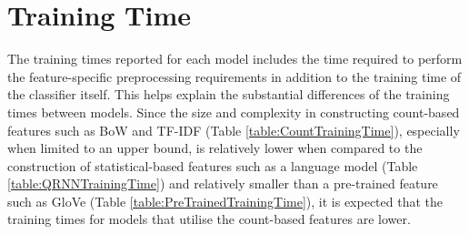 \documentclass[a4paper,twoside,phd]{BYUPhys}
\begin{document}
\section{Training Time}
\label{sec:TrainingTime}

The training times reported for each model includes the time required to perform the feature-specific preprocessing requirements in addition to the training time of the classifier itself. This helps explain the substantial differences of the training times between models. Since the size and complexity in constructing count-based features such as BoW and TF-IDF (Table \ref{table:CountTrainingTime}), especially when limited to an upper bound, is relatively lower when compared to the construction of statistical-based features such as a language model (Table \ref{table:QRNNTrainingTime}) and relatively smaller than a pre-trained feature such as GloVe (Table \ref{table:PreTrainedTrainingTime}), it is expected that the training times for models that utilise the count-based features are lower.
\end{document}
